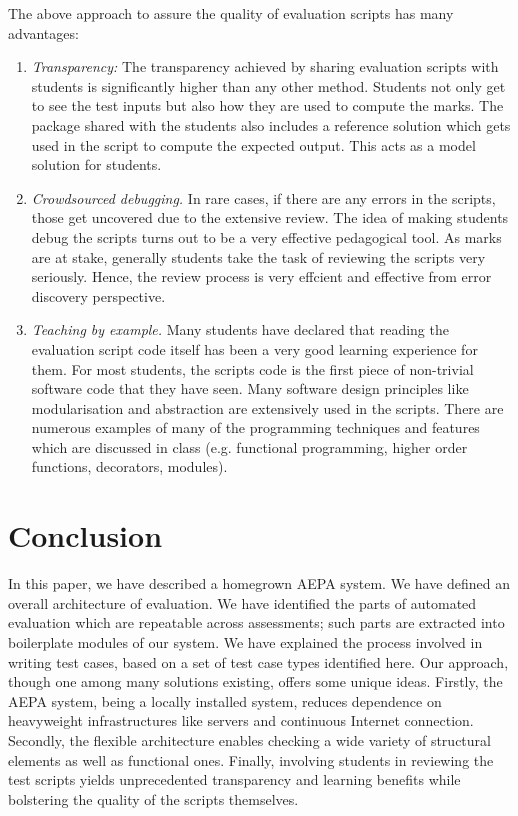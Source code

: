 \documentclass[sigconf]{acmart}
\begin{document}
The above approach to assure the quality of evaluation scripts has many advantages:
\begin{enumerate}
\item \emph{Transparency:} The transparency achieved by sharing evaluation scripts with students is significantly higher than any other method. Students not only get to see the test inputs but also how they are used to compute the marks. The package shared with the students also includes a reference solution which gets used in the script to compute the expected output. This acts as a model solution for students.
\item \emph{Crowdsourced debugging.} In rare cases, if there are any errors in the scripts, those get uncovered due to the extensive review. The idea of making students debug the scripts turns out to be a very effective pedagogical tool. As marks are at stake, generally  students take the task of reviewing the scripts very seriously. Hence, the review process is very effcient and effective from error discovery perspective.
\item \emph{Teaching by example.} Many students have declared that reading the evaluation script code itself has been a very good learning experience for them. For most students, the scripts code is the first piece of non-trivial software code that they have seen. Many software design principles like modularisation and abstraction are extensively used in the scripts. There are numerous examples of many of the programming techniques and features which are discussed in class (e.g. functional programming, higher order functions, decorators, modules).
\end{enumerate}
\section{Conclusion}
In this paper, we have described a homegrown AEPA system. We have defined an overall architecture of evaluation. We have identified the parts of automated evaluation which are repeatable across assessments; such parts are extracted into boilerplate modules of our system. We have explained the process involved in writing test cases, based on a set of test case types identified here. Our approach, though one among many solutions existing, offers some unique ideas. Firstly, the AEPA system, being a locally installed system, reduces dependence on heavyweight infrastructures like servers and continuous Internet connection. Secondly, the flexible architecture enables checking a wide variety of structural elements as well as functional ones. Finally, involving students in reviewing the test scripts yields unprecedented transparency and learning benefits while bolstering the quality of the scripts themselves.
\end{document}
